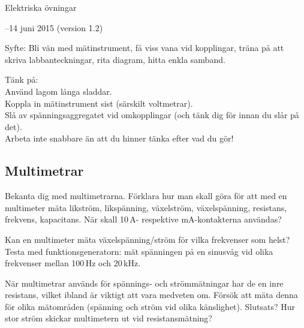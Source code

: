\documentclass[a4paper,11pt]{article}
\begin{document}
\begin{center}
 {\sf \LARGE Elektriska övningar}
\end{center}


\begin{center}
 {--14 juni 2015 (version 1.2)}
\end{center}

\vspace{5mm} 


Syfte: Bli vän med mätinstrument, få viss vana vid kopplingar, träna 
på att skriva labbanteckningar, rita diagram, hitta enkla samband. 
 
{\sf  Tänk på:\\
Använd lagom långa sladdar.\\
Koppla in mätinstrument sist (särskilt voltmetrar).\\
Slå av spänningsaggregatet vid omkopplingar (och tänk dig för innan 
du slår på det).\\
Arbeta inte snabbare än att du hinner tänka efter vad du gör!}

\subsection*{Multimetrar}

Bekanta dig med multimetrarna.  Förklara
hur man skall göra för att med en multimeter mäta likström,
likspänning, växelström, växelspänning, resistans, 
frekvens, kapacitans. När skall 10\,A- respektive mA-kontakterna 
användas?



Kan en multimeter mäta växelspänning/ström för vilka frekvenser som 
helst? Testa med funktionsgeneratorn: mät spänningen på en sinusvåg vid olika
frekvenser mellan 100\,Hz och 20\,kHz.

När multimetrar används för spännings- och strömmätningar
har de en inre resistans, vilket ibland är viktigt att vara medveten
om. Försök att mäta denna för olika mätområden (spänning och ström vid olika
känslighet). Slutsats? Hur stor ström skickar multimetern ut vid
resistansmätning? 
\end{document}
